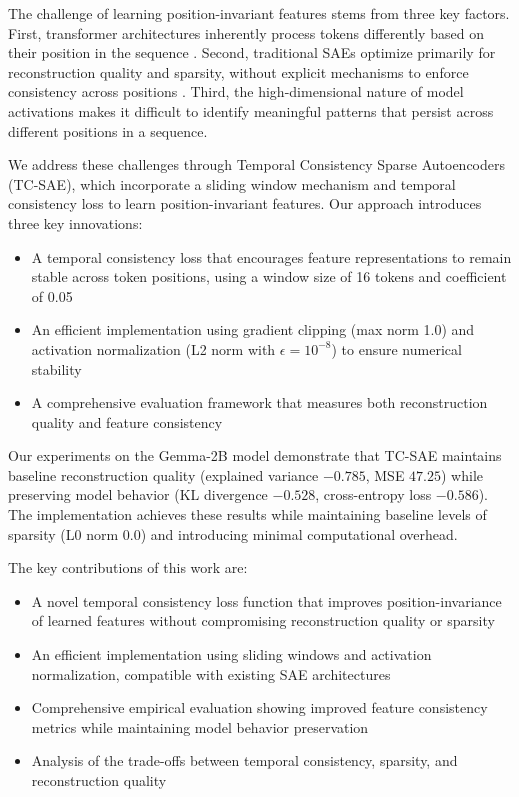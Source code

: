 \documentclass{article} %
\begin{document}
The challenge of learning position-invariant features stems from three key factors. First, transformer architectures inherently process tokens differently based on their position in the sequence \cite{vaswani2017attention}. Second, traditional SAEs optimize primarily for reconstruction quality and sparsity, without explicit mechanisms to enforce consistency across positions \cite{goodfellow2016deep}. Third, the high-dimensional nature of model activations makes it difficult to identify meaningful patterns that persist across different positions in a sequence.

We address these challenges through Temporal Consistency Sparse Autoencoders (TC-SAE), which incorporate a sliding window mechanism and temporal consistency loss to learn position-invariant features. Our approach introduces three key innovations:
\begin{itemize}
    \item A temporal consistency loss that encourages feature representations to remain stable across token positions, using a window size of 16 tokens and coefficient of 0.05
    \item An efficient implementation using gradient clipping (max norm 1.0) and activation normalization (L2 norm with $\epsilon=10^{-8}$) to ensure numerical stability
    \item A comprehensive evaluation framework that measures both reconstruction quality and feature consistency
\end{itemize}

Our experiments on the Gemma-2B model demonstrate that TC-SAE maintains baseline reconstruction quality (explained variance $-0.785$, MSE $47.25$) while preserving model behavior (KL divergence $-0.528$, cross-entropy loss $-0.586$). The implementation achieves these results while maintaining baseline levels of sparsity (L0 norm $0.0$) and introducing minimal computational overhead.

The key contributions of this work are:
\begin{itemize}
    \item A novel temporal consistency loss function that improves position-invariance of learned features without compromising reconstruction quality or sparsity
    \item An efficient implementation using sliding windows and activation normalization, compatible with existing SAE architectures
    \item Comprehensive empirical evaluation showing improved feature consistency metrics while maintaining model behavior preservation
    \item Analysis of the trade-offs between temporal consistency, sparsity, and reconstruction quality
\end{itemize}
\end{document}
